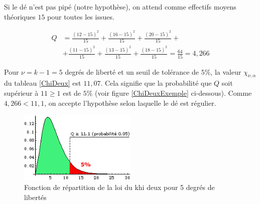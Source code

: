 \documentclass[12pt,a4paper]{article}
\begin{document}
Si le dé n'est pas pipé (notre hypothèse), on attend comme effectifs moyens théoriques $15$ pour toutes les issues.

\begin{align*}
Q & = \frac{{{{\left( {12 - 15} \right)}^2}}}{{15}} + \frac{{{{\left( {16 - 15} \right)}^2}}}{{15}} + \frac{{{{\left( {20 - 15} \right)}^2}}}{{15}} +\\
& + \frac{{{{\left( {11 - 15} \right)}^2}}}{{15}} + \frac{{{{\left( {13 - 15} \right)}^2}}}{{15}} + \frac{{{{\left( {18 - 15} \right)}^2}}}{{15}} = \frac{{64}}{{15}} = 4,266
\end{align*}

Pour $\nu = k-1=5$ degrés de liberté et un seuil de tolérance de $5\%$, la valeur $\chi_{\nu, \alpha}$ du tableau \eqref{ChiDeux} est $11,07$. Cela signifie que la probabilité que $Q$ soit supérieur à $11\geq 1$ est de $5\%$ (voir figure \eqref{ChiDeuxExemple} ci-dessous). Comme $4,266 < 11,1$, on accepte l'hypothèse selon laquelle le dé est régulier.

\begin{figure}[!h]
\centering
\includegraphics[width=0.5\textwidth]{images/Chi_deux_exemple.png}
\caption{Fonction de répartition de la loi du khi deux pour 5 degrés de libertés}
\label{ChiDeuxExemple}
\end{figure}
\end{document}
